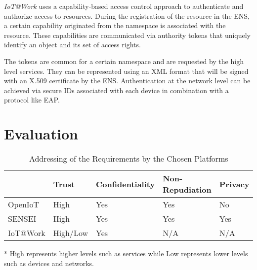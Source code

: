 \documentclass[journal]{IEEEtran}
\begin{document}
  \emph{IoT@Work} uses a capability-based access control approach to authenticate and authorize access to resources. During the registration of the resource in the ENS, a certain capability originated from the namespace is associated with the resource. These capabilities are communicated via authority tokens that uniquely identify an object and its set of access rights.

  The tokens are common for a certain namespace and are requested by the high level services. They can be represented using an XML format that will be signed with an X.509 certificate by the ENS. Authentication at the network level can be achieved via secure IDs associated with each device in combination with a protocol like EAP.

\section{Evaluation}
  
  \begin{table}[!t]
    \begin{threeparttable}
      \renewcommand{\arraystretch}{1.3}    
      \caption{Addressing of the Requirements by the Chosen Platforms}
      \label{evaluation_table}        
      \begin{tabular} {
                        p{1cm}
                        >{\centering\arraybackslash}p{1.3cm}
                        >{\centering\arraybackslash}p{1.5cm}
                        >{\centering\arraybackslash}p{2cm}
                        >{\centering\arraybackslash}p{1cm}
                      }
        \hline      
                     & Trust \tnote{*}      & Confidentiality & Non-Repudiation & Privacy \\
        \hline
        OpenIoT      & High       & Yes             & Yes             & No      \\
        SENSEI       & High       & Yes             & Yes             & Yes     \\
        IoT@Work     & High/Low   & Yes             & N/A             & N/A     \\ 
        \hline      
      \end{tabular}
      \begin{tablenotes}
      \item[*] High represents higher levels such as services while Low represents lower levels such as devices and networks.
      \end{tablenotes}
    \end{threeparttable}
  \end{table}
\end{document}
